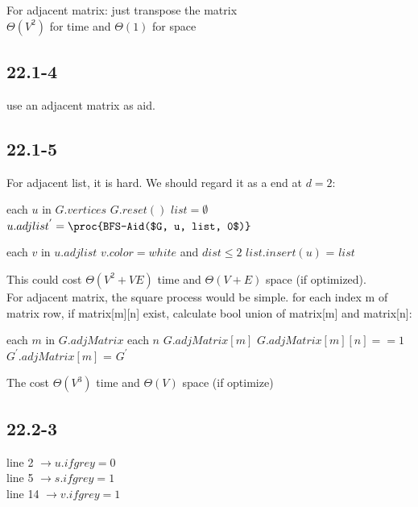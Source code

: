 \documentclass[]{article}
\begin{document}
For adjacent matrix: just transpose the matrix\\
$\Theta (V^2)$ for time and $\Theta(1)$ for space

\subsection{22.1-4}
use an adjacent matrix as aid.

\subsection{22.1-5}

For adjacent list, it is hard. We should regard it as a  end at $d = 2$:

\begin{codebox}
	
	\li \For each $u$ in $G.vertices$
	\li 	\Do $G.reset()$
	\li     $list = \emptyset$
	\li 	$u.adjlist^{'} = \proc{BFS-Aid($G, u, list, 0$)}$
	\End
	\End
\end{codebox}

\begin{codebox}
	
	\li \For each $v$ in $u.adjlist$
	\li 	\Do \If $v.color = white$ and $dist \le 2$ 
	\li			\Then $list.insert(u)$
	\li 		{}
	\End=
	\End
	\li \Return $list$
\end{codebox}

This could cost $\Theta(V^2 + VE)$ time and $\Theta(V+E)$ space (if optimized).\\

For adjacent matrix, the square process would be simple. for each index m of matrix row, if matrix[m][n] exist, calculate bool union of matrix[m] and matrix[n]:

\begin{codebox}
	
	\li \For each $m$ in $G.adjMatrix$
	\li \Do \For each $n$ $G.adjMatrix[m]$
	\li 	\Do \If $G.adjMatrix[m][n] == 1$
	\li         \Then $G^{'}.adjMatrix[m]$ = 
	\End
	\End
	\End
	\li \Return $G^{'}$
\end{codebox}

The  cost $\Theta(V^3)$ time and $\Theta(V)$ space (if optimize)

\subsection{22.2-3}
line 2 $\rightarrow u.ifgrey = 0$\\
line 5 $\rightarrow s.ifgrey = 1$\\
line 14 $\rightarrow v.ifgrey = 1$
\end{document}

